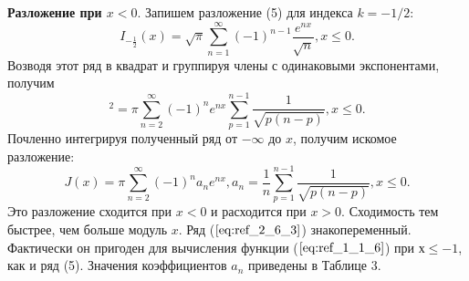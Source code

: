 \textbf{Разложение при $x < 0.$} Запишем разложение (5) для индекса $k=-1/2$:
\begin{equation}
I_{-\frac{1}{2}}(x)=\sqrt{\pi} \sum\limits_{n=1}^{\infty} (-1)^{n-1} \frac{e^{nx}}{\sqrt{n}},x \leqslant 0.
\label{eq:ref_2_6_1}
\end{equation}
Возводя этот ряд в квадрат и группируя члены с одинаковыми экспонентами, получим
\begin{equation}
[I_{-\frac{1}{2}}(x)]^2 = \pi \sum\limits_{n=2}^{\infty} (-1)^n e^{nx} \sum\limits_{p=1}^{n-1} \frac{1}{\sqrt{p(n-p)}},x \leqslant 0.
\label{eq:ref_2_6_2}
\end{equation}
Почленно интегрируя полученный ряд от $-\infty$ до $x$, получим искомое
разложение:
\begin{equation}
J(x) = \pi \sum\limits_{n=2}^{\infty} (-1)^n a_n e^{nx}, a_n = \frac{1}{n} \sum_{p=1}^{n-1} \frac{1}{\sqrt{p(n-p)}}, x \leqslant 0.
\label{eq:ref_2_6_3}
\end{equation}
Это разложение сходится при $x < 0$ и расходится при $x > 0$. Сходимость тем
быстрее, чем больше модуль $x$. Ряд ($\ref{eq:ref_2_6_3}$) знакопеременный. Фактически он
пригоден для вычисления функции ($\ref{eq:ref_1_1_6}$) при $х \leqslant -1$, как и ряд (5). Значения
коэффициентов $a_n$ приведены в Таблице 3.


